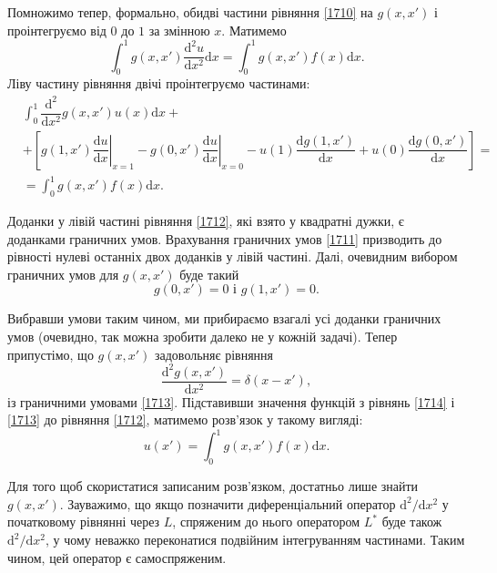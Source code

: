 \documentclass[14pt,twoside]{extreport}
\theoremstyle{mystyle}
\numberwithin{equation}{chapter}
\begin{document}
Помножимо тепер, формально, обидві частини рівняння \eqref{1710} на $g(x, x')$ і проінтегруємо від $0$ до $1$ за змінною $x$. Матимемо
$$
\int_{0}^{1}g(x, x')\frac{\mathrm{d}^{2}u}{\mathrm{d}x^{2}}\mathrm{d}x=\int_{0}^{1}g(x, x')f(x)\mathrm{d}x.
$$
Ліву частину рівняння двічі проінтегруємо частинами:
\begin{equation}\label{1712}
\begin{array}{ll}
&\displaystyle\int_{0}^{1}\dfrac{\mathrm{d}^{2}}{\mathrm{d}x^{2}}g(x, x')u(x)\mathrm{d}x +\\
&+\left[g(1, x')\left.\dfrac{\mathrm{d}u}{\mathrm{d}x}\right|_{x=1}-g(0,x')\left.\dfrac{\mathrm{d}u}{\mathrm{d}x}\right|_{x=0}-u(1)\dfrac{\mathrm{d}g(1,x')}{\mathrm{d}x}+u(0)\dfrac{\mathrm{d}g(0,x')}{\mathrm{d}x}\right]=\\
&=\displaystyle\int_{0}^{1}g(x, x')f(x)\mathrm{d}x.
\end{array}
\end{equation}

Доданки у лівій частині рівняння \eqref{1712}, які взято у квадратні дужки, є доданками граничних умов. Врахування граничних умов \eqref{1711} призводить до рівності нулеві останніх двох доданків у лівій частині. Далі, очевидним вибором граничних умов для $g(x, x')$ буде такий
\begin{equation}\label{1713}
g(0,x')=0 \textrm{ і }g(1,x')=0.
\end{equation}

Вибравши умови таким чином, ми прибираємо взагалі усі доданки граничних умов (очевидно, так можна зробити далеко не у кожній задачі). Тепер припустімо, що $g(x, x')$ задовольняє рівняння
\begin{equation}\label{1714}
\frac{\mathrm{d}^{2}g(x,x')}{\mathrm{d}x^{2}}=\delta(x-x'),
\end{equation}
із граничними умовами \eqref{1713}. Підставивши значення функцій з рівнянь \eqref{1714} і \eqref{1713} до рівняння \eqref{1712}, матимемо розв'язок у такому вигляді:
\begin{equation}\label{1715}
u(x')=\int_{0}^{1}g(x, x')f(x)\mathrm{d}x.
\end{equation}

Для того щоб скористатися записаним розв'язком, достатньо лише знайти $g(x, x')$. Зауважимо, що якщо позначити диференціальний оператор $\mathrm{d}^{2}/\mathrm{d}x^{2}$ у початковому рівнянні через $L$, спряженим до нього оператором $L^{*}$ буде також $\mathrm{d}^{2}/\mathrm{d}x^{2}$, у чому неважко переконатися подвійним інтегруванням частинами. Таким чином, цей оператор є самоспряженим.
\end{document}
